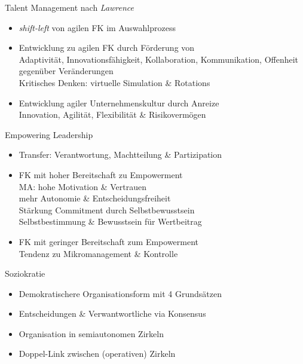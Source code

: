 \documentclass{cheatsheet}
\begin{document}
    \begin{warningbox}{Talent Management nach \emph{Lawrence}}
        \begin{itemize}
            \item \emph{shift-left} von agilen FK im Auswahlprozess
            \item Entwicklung zu agilen FK durch Förderung von\\
            \ra Adaptivität, Innovationsfähigkeit, Kollaboration, Kommunikation, Offenheit gegenüber Veränderungen\\
            \ra Kritisches Denken: virtuelle Simulation \& Rotations
            \item Entwicklung agiler Unternehmenskultur durch Anreize\\
            \ra Innovation, Agilität, Flexibilität \& Risikovermögen
        \end{itemize}
    \end{warningbox}
    \begin{sectionbox}{Empowering Leadership}
        \begin{itemize}
            \item Transfer: Verantwortung, Machtteilung \& Partizipation
            \item FK mit hoher Bereitschaft zu Empowerment\\
            \ra MA: hohe Motivation \& Vertrauen\\
            \ra mehr Autonomie \& Entscheidungsfreiheit\\
            \ra Stärkung Commitment durch Selbstbewusstsein\\
            \ra Selbstbestimmung \& Bewusstsein für Wertbeitrag
            \item FK mit geringer Bereitschaft zum Empowerment\\
            \ra Tendenz zu Mikromanagement \& Kontrolle
        \end{itemize}
    \end{sectionbox}
    \begin{sectionbox}{Soziokratie}
        \begin{itemize}
            \item Demokratischere Organisationsform mit 4 Grundsätzen
            \item Entscheidungen \& Verwantwortliche via Konsensus
            \item Organisation in semiautonomen Zirkeln
            \item Doppel-Link zwischen (operativen) Zirkeln
        \end{itemize}
    \end{sectionbox}
\end{document}
